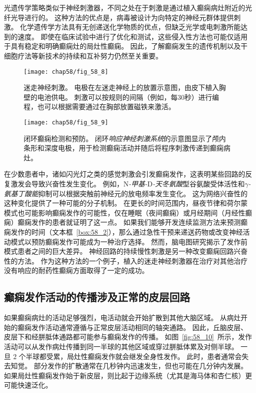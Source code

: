 \begin{proposition}[实时检测和预防癫痫的新方法]
	\quad \quad 光遗传学策略类似于神经刺激器，不同之处在于刺激是通过植入癫痫病灶附近的光纤光导进行的。
	这种方法的优点是，病毒被设计为向特定的神经元群体提供刺激。
	化学遗传学方法具有无创递送化学物质的优点，但缺乏光学或电刺激所能达到的速度。
	即使在临床试验中进行了优化和测试，这些侵入性方法也可能仅适用于具有稳定和明确癫痫灶的局灶性癫痫。
	因此，了解癫痫发生的遗传机制以及干细胞疗法等新技术的持续和互补努力仍然至关重要。
	
\end{proposition}


\begin{figure}[htbp]
	\centering
	\texttt{[image: chap58/fig\_58\_8]}
	\caption{迷走神经刺激。
		电极在左迷走神经上的放置示意图，由皮下植入胸壁的电池供电。
		刺激可以按规则的间隔（例如，每30秒）进行编程，也可以根据需要通过在胸部放置磁铁来激活\cite{stacey2008technology}。}
	\label{fig:58_8}
\end{figure}


\begin{figure}[htbp]
	\centering
	\texttt{[image: chap58/fig\_58\_9]}
	\caption{闭环癫痫检测和预防。
		闭环\textit{响应神经刺激系统}的示意图显示了颅内条形和深度电极，用于检测癫痫活动并随后将程序刺激传递到癫痫病灶\cite{heck2014two}。}
	\label{fig:58_9}
\end{figure}



在少数患者中，诸如闪光灯之类的感觉刺激会引发癫痫发作，这表明某些回路的反复激发会导致兴奋性发生变化。
例如，N\textit{-甲基-}D\textit{-天冬氨酸}型谷氨酸受体活性和\textit{$\gamma$-氨基丁酸能}抑制可以根据突触前神经元的放电频率发生变化。
这为网络兴奋性的这种变化提供了一种可能的分子机制。
在更长的时间范围内，昼夜节律和荷尔蒙模式也可能影响癫痫发作的可能性，仅在睡眠（夜间癫痫）或月经期间（月经性癫痫）癫痫发作的患者就证明了这一点。
如果我们能够开发连续监测方法来预测癫痫发作的时间（文本框~\ref{box:58_2}），那么通过急性干预来递送药物或改变神经活动模式以预防癫痫发作可能成为一种治疗选择。
然而，脑电图研究揭示了发作前模式患者之间的巨大差异。
神经回路的持续慢性刺激是另一种改变癫痫回路兴奋性的方法。
作为这种方法的一个例子，植入的迷走神经刺激器在治疗对其他治疗没有响应的耐药性癫痫方面取得了一定的成功。



\subsection{癫痫发作活动的传播涉及正常的皮层回路}

如果癫痫病灶的活动足够强烈，电活动就会开始扩散到其他大脑区域。
从病灶开始的癫痫发作活动通常遵循与正常皮层活动相同的轴突通路。
因此，丘脑皮层、皮层下和经胼胝体通路都可能参与癫痫发作的传播。
如图~\ref{fig:58_10}~所示，发作活动可以从发作病灶传播到同一半球的其他区域或穿过胼胝体累及对侧半球。
一旦 2 个半球都受累，局灶性癫痫发作就会继发全身性发作。
此时，患者通常会失去知觉。
部分发作的扩散通常在几秒钟内迅速发生，但也可能在几分钟内发展。
如果局灶性癫痫发作始于新皮层，则比起于边缘系统（尤其是海马体和杏仁核）更可能快速泛化。


